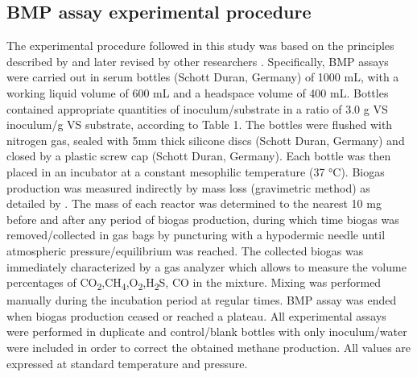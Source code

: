 \subsection{BMP assay experimental procedure}
The experimental procedure followed in this study was based on the principles described by \cite{Owen_1979} and later revised by other researchers \cite{Angelidaki_2009,Holliger_2016}. Specifically, BMP assays were carried out in serum bottles (Schott Duran, Germany) of 1000 mL, with a working liquid volume of 600 mL and a headspace volume of 400 mL. Bottles contained appropriate quantities of inoculum/substrate in a ratio of 3.0 g VS inoculum/g VS substrate, according to Table 1. The bottles were flushed with nitrogen gas, sealed with 5mm thick silicone discs (Schott Duran, Germany) and closed by a plastic screw cap (Schott Duran, Germany). Each bottle was then placed in an incubator at a constant mesophilic temperature (37 °C). Biogas production was measured indirectly by mass loss (gravimetric method) as detailed by \cite{Hafner_2015}. The mass of each reactor was determined to the nearest 10 mg before and after any period of biogas production, during which time biogas was removed/collected in gas bags by puncturing with a hypodermic needle until atmospheric pressure/equilibrium was reached. The collected biogas was immediately characterized by a gas analyzer which allows to measure the volume percentages of CO\textsubscript{2},CH\textsubscript{4},O\textsubscript{2},H\textsubscript{2}S, CO in the mixture. Mixing was performed manually during the incubation period at regular times. BMP assay was ended when biogas production ceased or reached a plateau. All experimental assays were performed in duplicate and control/blank bottles with only inoculum/water were included in order to correct the obtained methane production.  All values are expressed at standard temperature and pressure.

